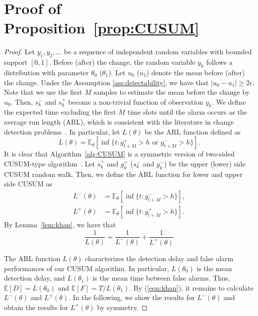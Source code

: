 \documentclass[letterpaper]{article} %
\begin{document}
\section{Proof of Proposition~\ref{prop:CUSUM}}
\begin{proof}
Let $y_1,y_2,\ldots$ be a sequence of independent random variables with bounded support $[0,1]$. Before (after) the change, the random variable $y_k$ follows a distribution with parameter $\theta_0$ ($\theta_1$). Let $u_0$ ($u_1$) denote the mean before (after) the change. Under the Assumption \ref{ass:detectability}, we have that $|u_0-u_1|\geq2\epsilon$.
Note that we use the first $M$ samples to estimate the mean before the change by $\hat{u}_0$. Then, $s_k^-$ and $s_k^+$ become a non-trivial function of observation $y_k$. We define the expected time excluding the first $M$ time slots until the alarm occurs as the average run length (ARL), which is consistent with the literature in change detection problems~\cite{basseville1993detection}. In particular, let $L(\theta)$ be the ARL function defined as
\begin{equation}
L(\theta)=\mathbb{E}_{\theta}\left[\inf\{t:g^+_{t+M}>h \text{~or~} g^-_{t+M}>h\}\right].
\end{equation}
It is clear that Algorithm~\ref{alg:CUSUM} is a symmetric version of two-sided CUSUM-type algorithm~\cite{khan1981note}. Let $s_k^+$ and $g_k^+$ ($s_k^-$ and $g_k^-$) be the upper (lower) side CUSUM random walk. Then, we define the ARL function for lower and upper side CUSUM as
\begin{align}
L^-(\theta)&=\mathbb{E}_{\theta}\left[\inf\{t:g^-_{t+M}>h\}\right],\\
L^+(\theta)&=\mathbb{E}_{\theta}\left[\inf\{t:g^+_{t+M}>h\}\right].
\end{align}
By Lemma~\ref{lem:khan}, we have that 
\begin{equation}\label{eqn:khan}
\frac{1}{L(\theta)}=\frac{1}{L^-(\theta)}+\frac{1}{L^+(\theta)}
\end{equation}

The ARL function $L(\theta)$ characterizes the detection delay and false alarm performances of our CUSUM algorithm. In particular, $L(\theta_0)$ is the mean detection delay, and $L(\theta_1)$ is the mean time between false alarms. Thus, $\mathbb{E}[D]=L(\theta_0)$ and $\mathbb{E}[F]=T/L(\theta_1)$. By (\ref{eqn:khan}), it remains to calculate $L^-(\theta)$ and $L^+(\theta)$. In the following, we show the results for $L^-(\theta)$ and obtain the results for $L^+(\theta)$ by symmetry.


\end{proof}
\end{document}
